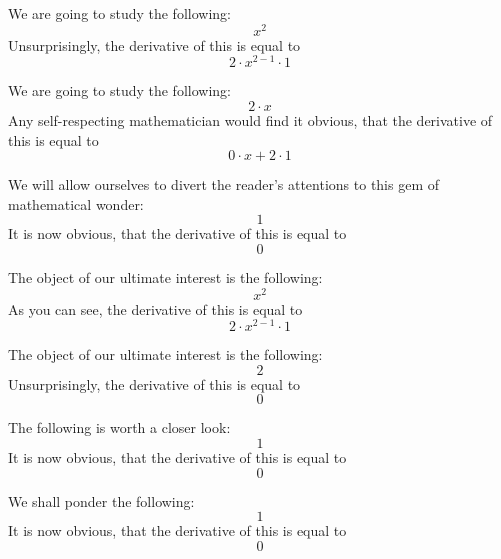 \documentclass{article}
\begin{document}
We are going to study the following:
\begin{equation}
x ^{2 } 
\end{equation}
Unsurprisingly, the derivative of this is equal to
\begin{equation}
2 \cdot x ^{2 - 1 } \cdot 1 
\end{equation}

We are going to study the following:
\begin{equation}
2 \cdot x 
\end{equation}
Any self-respecting mathematician would find it obvious, that the derivative of this is equal to
\begin{equation}
0 \cdot x + 2 \cdot 1 
\end{equation}

We will allow ourselves to divert the reader's attentions to this gem of mathematical wonder:
\begin{equation}
1 
\end{equation}
It is now obvious, that the derivative of this is equal to
\begin{equation}
0 
\end{equation}

The object of our ultimate interest is the following:
\begin{equation}
x ^{2 } 
\end{equation}
As you can see, the derivative of this is equal to
\begin{equation}
2 \cdot x ^{2 - 1 } \cdot 1 
\end{equation}

The object of our ultimate interest is the following:
\begin{equation}
2 
\end{equation}
Unsurprisingly, the derivative of this is equal to
\begin{equation}
0 
\end{equation}

The following is worth a closer look:
\begin{equation}
1 
\end{equation}
It is now obvious, that the derivative of this is equal to
\begin{equation}
0 
\end{equation}

We shall ponder the following:
\begin{equation}
1 
\end{equation}
It is now obvious, that the derivative of this is equal to
\begin{equation}
0 
\end{equation}
\end{document}
